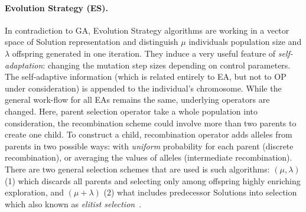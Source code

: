 \paragraph{Evolution Strategy (ES).} In contradiction to GA, Evolution Strategy algorithms are working in a vector space of Solution representation and distinguish $\mu$ individuals population size and $\lambda$ offspring generated in one iteration. They induce a very useful feature of \textit{self-adaptation}: changing the mutation step sizes depending on control parameters. The self-adaptive information (which is related entirely to EA, but not to OP under consideration) is appended to the individual's chromosome. While the general work-flow for all EAs remains the same, underlying operators are changed. Here, parent selection operator take a whole population into consideration, the recombination scheme could involve more than two parents to create one child. To construct a child, recombination operator adds alleles from parents in two possible ways: with \textit{uniform} probability for each parent (discrete recombination), or averaging the values of alleles (intermediate recombination). There are two general selection schemes that are used is such algorithms: $(\mu,\lambda)$ (1) which discards all parents and selecting only among offspring highly enriching exploration, and $(\mu+\lambda)$ (2) what includes predecessor Solutions into selection which also known as \textit{elitist selection}~\cite{eiben2015popular}.

